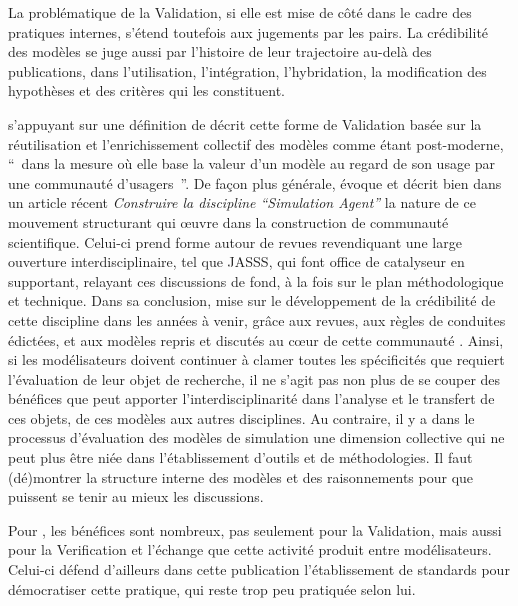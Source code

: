 La problématique de la Validation, si elle est mise de côté dans le cadre des pratiques internes, s'étend toutefois aux jugements par les pairs. La crédibilité des modèles se juge aussi par l'histoire de leur trajectoire au-delà des publications, dans l'utilisation, l'intégration, l'hybridation, la modification des hypothèses et des critères qui les constituent.

\textcites{Rouchier2013} s'appuyant sur une définition de \textcite{Ahrweiler2005} décrit cette forme de Validation basée sur la réutilisation et l'enrichissement collectif des modèles comme étant post-moderne, \enquote{ dans la mesure où elle base la valeur d'un modèle au regard de son usage par une communauté d'usagers }. De façon plus générale, \autocite{Rouchier2013} évoque et décrit bien dans un article récent \textit{Construire la discipline \enquote{Simulation Agent}} la nature de ce mouvement structurant qui œuvre dans la construction de communauté scientifique. Celui-ci prend forme autour de revues revendiquant une large ouverture interdisciplinaire, tel que JASSS, qui font office de catalyseur en supportant, relayant ces discussions de fond, à la fois sur le plan méthodologique et technique. Dans sa conclusion, \autocite{Rouchier2013} mise sur le développement de la crédibilité de cette discipline dans les années à venir, grâce aux revues, aux règles de conduites édictées, et aux modèles repris et discutés au cœur de cette communauté \autocite{Hales2003}. Ainsi, si les modélisateurs doivent continuer à clamer toutes les spécificités que requiert l'évaluation de leur objet de recherche, il ne s'agit pas non plus de se couper des bénéfices que peut apporter l'interdisciplinarité dans l'analyse et le transfert de ces objets, de ces modèles aux autres disciplines. Au contraire, il y a dans le processus d'évaluation des modèles de simulation une dimension collective qui ne peut plus être niée dans l'établissement d'outils et de méthodologies. Il faut (dé)montrer la structure interne des modèles et des raisonnements pour que puissent se tenir au mieux les discussions.

Pour \textcite{Wilensky2007a}, les bénéfices sont nombreux, pas seulement pour la Validation, mais aussi pour la Verification  et l'échange que cette activité produit entre modélisateurs. Celui-ci défend d'ailleurs dans cette publication l'établissement de standards pour démocratiser cette pratique, qui reste trop peu pratiquée selon lui.


